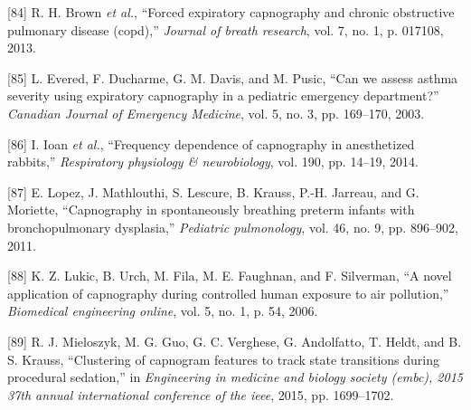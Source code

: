 \documentclass[12pt,]{article}
\begin{document}
\leavevmode\hypertarget{ref-brown2013forced}{}%
{[}84{]} R. H. Brown \emph{et al.}, ``Forced expiratory capnography and
chronic obstructive pulmonary disease (copd),'' \emph{Journal of breath
research}, vol. 7, no. 1, p. 017108, 2013.

\leavevmode\hypertarget{ref-evered2003can}{}%
{[}85{]} L. Evered, F. Ducharme, G. M. Davis, and M. Pusic, ``Can we
assess asthma severity using expiratory capnography in a pediatric
emergency department?'' \emph{Canadian Journal of Emergency Medicine},
vol. 5, no. 3, pp. 169--170, 2003.

\leavevmode\hypertarget{ref-ioan2014frequency}{}%
{[}86{]} I. Ioan \emph{et al.}, ``Frequency dependence of capnography in
anesthetized rabbits,'' \emph{Respiratory physiology \& neurobiology},
vol. 190, pp. 14--19, 2014.

\leavevmode\hypertarget{ref-lopez2011capnography}{}%
{[}87{]} E. Lopez, J. Mathlouthi, S. Lescure, B. Krauss, P.-H. Jarreau,
and G. Moriette, ``Capnography in spontaneously breathing preterm
infants with bronchopulmonary dysplasia,'' \emph{Pediatric pulmonology},
vol. 46, no. 9, pp. 896--902, 2011.

\leavevmode\hypertarget{ref-lukic2006novel}{}%
{[}88{]} K. Z. Lukic, B. Urch, M. Fila, M. E. Faughnan, and F.
Silverman, ``A novel application of capnography during controlled human
exposure to air pollution,'' \emph{Biomedical engineering online}, vol.
5, no. 1, p. 54, 2006.

\leavevmode\hypertarget{ref-mieloszyk2015clustering}{}%
{[}89{]} R. J. Mieloszyk, M. G. Guo, G. C. Verghese, G. Andolfatto, T.
Heldt, and B. S. Krauss, ``Clustering of capnogram features to track
state transitions during procedural sedation,'' in \emph{Engineering in
medicine and biology society (embc), 2015 37th annual international
conference of the ieee}, 2015, pp. 1699--1702.
\end{document}

